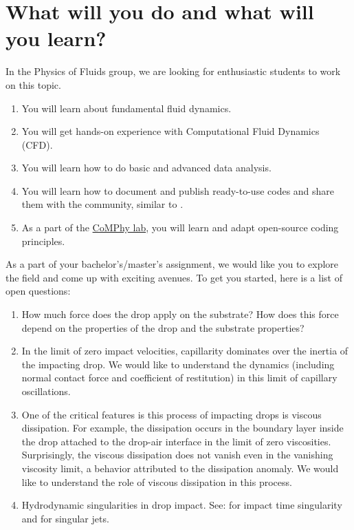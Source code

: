 \documentclass[a4paper,10pt]{article}
\begin{document}
\section*{What will you do and what will you learn?}
In the Physics of Fluids group, we are looking for enthusiastic students to work on this topic.
\begin{enumerate}
\itemsep0em
\item You will learn about fundamental fluid dynamics.
\item You will get hands-on experience with Computational Fluid Dynamics (CFD).
\item You will learn how to do basic and advanced data analysis.
\item You will learn how to document and publish ready-to-use codes and share them with the community, similar to \citet{basiliskVatsal, basiliskVatsalDropFilm, basiliskVatsalViscousBouncing}. 
\item As a part of the \href{https://comphy-lab.org}{CoMPhy lab}, you will learn and adapt open-source coding principles. 
\end{enumerate}

As a part of your bachelor's/master's assignment, we would like you to explore the field and come up with exciting avenues. To get you started, here is a list of open questions:

\begin{enumerate}
 \item How much force does the drop apply on the substrate? How does this force depend on the properties of the drop and the substrate properties?
 \item In the limit of zero impact velocities, capillarity dominates over the inertia of the impacting drop. We would like to understand the dynamics (including normal contact force and coefficient of restitution) in this limit of capillary oscillations. 
 \item One of the critical features is this process of impacting drops is viscous dissipation. For example, the dissipation occurs in the boundary layer inside the drop attached to the drop-air interface in the limit of zero viscosities. Surprisingly, the viscous dissipation does not vanish even in the vanishing viscosity limit, a behavior attributed to the dissipation anomaly. We would like to understand the role of viscous dissipation in this process. 
 \item Hydrodynamic singularities in drop impact. See: \citet{mandre2012mechanism} for impact time singularity and \citet{Bartolo2006Singular, sanjay_lohse_jalaal_2021, zhang2022impact} for singular jets. 
\end{enumerate} 
\end{document}
